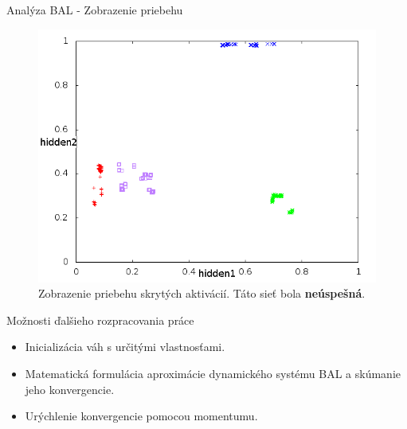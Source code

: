 \documentclass[xcolor=dvipsnames]{beamer}
\begin{document}
\begin{frame}{Analýza BAL - Zobrazenie priebehu}
  \begin{figure}[h!]  
    \centering
    \includegraphics[scale=0.4]{img/non-convergent.png}
    \caption{{\small Zobrazenie priebehu skrytých aktivácií. Táto sieť bola {\bf neúspešná}.}} 
  \end{figure} 
\end{frame}



\begin{frame}{Možnosti ďalšieho rozpracovania práce}
  \begin{itemize} 
    \item Inicializácia váh s určitými vlastnosťami.
    \item Matematická formulácia aproximácie dynamického systému BAL a skúmanie jeho konvergencie. 
    \item Urýchlenie konvergencie pomocou momentumu. 
  \end{itemize} 
\end{frame} 
\end{document}
